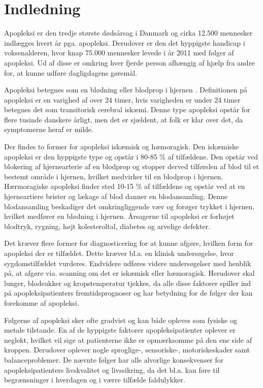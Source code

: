 \section{Indledning}
Apopleksi er den tredje største dødsårsag i Danmark og cirka 12.500 mennesker indlægges hvert år pga. apopleksi. Derudover er den det hyppigste handicap i voksenalderen, hvor knap 75.000 mennesker levede i år 2011 med følger af apopleksi. Ud af disse er omkring hver fjerde person afhængig af hjælp fra andre for, at kunne udføre dagligdagens gøremål. \cite{Hjernesagen2015a}

Apopleksi betegnes som en blødning eller blodprop i hjernen \cite{Hjernesagen2015a}. Definitionen på apopleksi er en varighed af over 24 timer, hvis varigheden er under 24 timer betegnes det som transitorisk cerebral iskæmi\cite{Sundhed.dk2014, Ritter2015}. Denne type apopleksi opstår for flere tusinde danskere årligt, men det er sjældent, at folk er klar over det, da symptomerne heraf er milde\cite{Hjernesagen2015a}.

Der findes to former for apopleksi iskæmisk og hæmoragisk.
Den iskæmiske apopleksi er den hyppigste type og opstår i 80-85 \% af tilfældene\cite{Sundhed.dk2014}. Den opstår ved blokering af hjernearterie af en blodprop og stopper derved tilførslen af blod til et bestemt område i hjernen, hvilket medvirker til en blodprop i hjernen\cite{Hjernesagen2015a}.
Hærmoragiske apopleksi finder sted 10-15 \% af tilfældene og opstår ved at en hjerneartiere brister og lækage af blod danner en blodansamling\cite{Sundhed.dk2014, Schulze2011}. Denne blodansamling beskadiger det omkringliggende væv og forøger trykket i hjernen, hvilket medfører en blødning i hjernen\citep{Caplan2006}. Årsagerne til apopleksi er forhøjet blodtryk, rygning, højt kolesteroltal, diabetes og arvelige defekter\cite{Academic2015}.

Det kræver flere former for diagnosticering for at kunne afgøre, hvilken form for apopleksi der er tilfældet. Dette kræver bl.a. en klinisk undersøgelse, hvor sygdomstilfældet vurderes.\citep{Sundhedsstyrelsen2009} Endvidere udføres videre undersøgelser med henblik på, at afgøre via. scanning om det er iskæmisk eller hæmoragisk. Herudover skal lunger, blodsukker og kropstemperatur tjekkes, da alle disse faktorer spiller ind på apopleksipatienters fremtidsprognoser og har betydning for de følger der kan forekomme af apopleksi.\citep{Sundhedsstyrelsen2009}

Følgerne af apopleksi sker ofte gradvist og kan både opleves som fysiske og metale tilstande\cite{Muus2008}. En af de hyppigste faktorer apopleksipatienter oplever er neglekt, hvilket vil sige at patienterne ikke er opmærksomme på den ene side af kroppen\cite{Sundhed.dk}. Derudover oplever nogle sproglige-, sensoriske-, motoriskeskader samt balanceproblemer\cite{Nichols1997, Muus2008}. De nævnte følger har alle alvorlige konsekvenser for apopleksipatienters livskvalitet og livssikring, da det bl.a. kan føre til  begrænsninger i hverdagen og i værre tilfælde faldulykker. 


